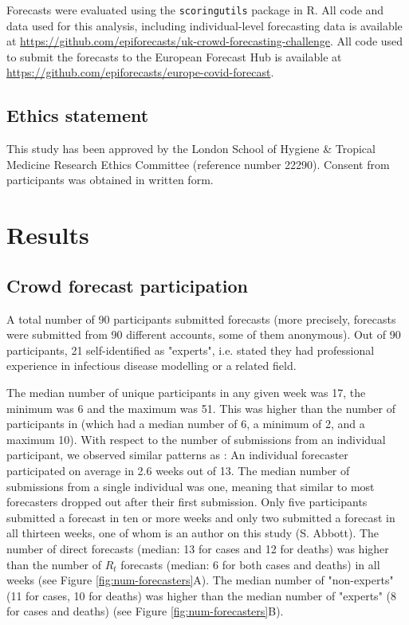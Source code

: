 \documentclass[10pt,a4paper,twocolumn]{article}
\begin{document}
Forecasts were evaluated using the \texttt{scoringutils} \citep{bosseEvaluatingForecastsScoringutils2022} package in \textsf{R}. All code and data used for this analysis, including individual-level forecasting data is available at \url{https://github.com/epiforecasts/uk-crowd-forecasting-challenge}. All code used to submit the forecasts to the European Forecast Hub is available at \url{https://github.com/epiforecasts/europe-covid-forecast}. 

\subsection*{Ethics statement}
This study has been approved by the London School of Hygiene \& Tropical Medicine Research Ethics Committee (reference number 22290). Consent from participants was obtained in written form.



\section*{Results}

\subsection*{Crowd forecast participation}

A total number of 90 participants submitted forecasts (more precisely, forecasts were submitted from 90 different accounts, some of them anonymous). Out of 90 participants, 21 self-identified as "experts", i.e. stated they had professional experience in infectious disease modelling or a related field. 

The median number of unique participants in any given week was 17, the minimum was 6 and the maximum was 51. This was higher than the number of participants in \cite{bosseComparingHumanModelbased2022} (which had a median number of 6, a minimum of 2, and a maximum 10). With respect to the number of submissions from an individual participant, we observed similar patterns as \cite{bosseComparingHumanModelbased2022}: An individual forecaster participated on average in 2.6 weeks out of 13. The median number of submissions from a single individual was one, meaning that similar to \citep{bosseComparingHumanModelbased2022} most forecasters dropped out after their first submission. Only five participants submitted a forecast in ten or more weeks and only two submitted a forecast in all thirteen weeks, one of whom is an author on this study (S. Abbott). The number of direct forecasts (median: 13 for cases and 12 for deaths) was higher than the number of $R_t$ forecasts (median: 6 for both cases and deaths) in all weeks (see Figure \ref{fig:num-forecasters}A). The median number of "non-experts" (11 for cases, 10 for deaths) was higher than the median number of "experts" (8 for cases and deaths) (see Figure \ref{fig:num-forecasters}B). 
\end{document}
